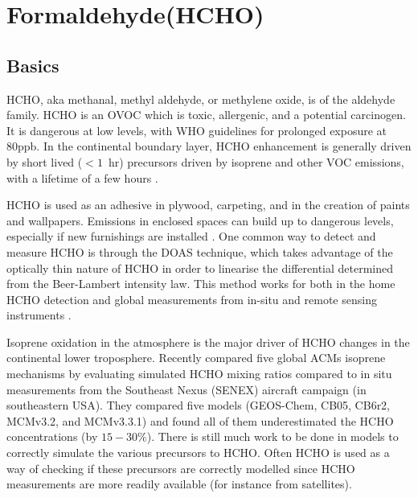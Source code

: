 \section{Formaldehyde(HCHO)}
\label{ch_LitRev:sec:HCHO}
  
  \subsection{Basics}
    HCHO, aka methanal, methyl aldehyde, or methylene oxide, is of the aldehyde family.
    HCHO is an OVOC which is toxic, allergenic, and a potential carcinogen. 
    It is dangerous at low levels, with WHO guidelines for prolonged exposure at 80ppb.
    In the continental boundary layer, HCHO enhancement is generally driven by short lived ($<1$~hr) precursors driven by isoprene and other VOC emissions, with a lifetime of a few hours \citep{Kefauver2014}.
    
    HCHO is used as an adhesive in plywood, carpeting, and in the creation of paints and wallpapers.
    Emissions in enclosed spaces can build up to dangerous levels, especially if new furnishings are installed \citep{Davenport2015}.
    One common way to detect and measure HCHO is through the DOAS technique, which takes advantage of the optically thin nature of HCHO in order to linearise the differential determined from the Beer-Lambert intensity law.
    This method works for both in the home HCHO detection and global measurements from in-situ and remote sensing instruments \citep{Guenther1995, Abad2015, Davenport2015}.
    
    Isoprene oxidation in the atmosphere is the major driver of HCHO changes in the continental lower troposphere.
    Recently \cite{Marvin2017} compared five global ACMs isoprene mechanisms by evaluating simulated HCHO mixing ratios compared to in situ measurements from the Southeast Nexus (SENEX) aircraft campaign (in southeastern USA).
    They compared five models (GEOS-Chem, CB05, CB6r2, MCMv3.2, and MCMv3.3.1) and found all of them underestimated the HCHO concentrations (by $15 - 30\%$).
    There is still much work to be done in models to correctly simulate the various precursors to HCHO.
    Often HCHO is used as a way of checking if these precursors are correctly modelled since HCHO measurements are more readily available (for instance from satellites).
    

